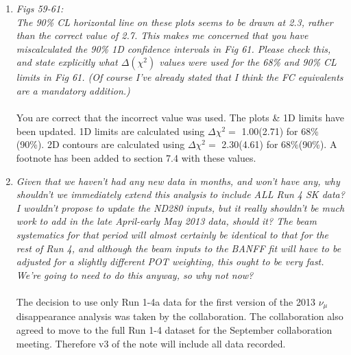 \begin{enumerate}
  
  \vspace{5 mm}
\item
  {\em
    Figs 59-61:\\
    The 90\% CL horizontal line on these plots seems to be drawn at 2.3, rather than the correct value of 2.7.
    This makes me concerned that you have miscalculated the 90\% 1D confidence intervals in Fig 61.
    Please check this, and state explicitly what $\Delta(\chi^2)$ values were used for the 68\% and 90\% CL limits in Fig 61.
    (Of course I've already stated that I think the FC equivalents are a mandatory addition.)
  }\\
  \\
  You are correct that the incorrect value was used. The plots \& 1D limits have been updated.
  1D limits are calculated using $\Delta \chi^2 =$ 1.00(2.71) for 68\%(90\%).
  2D contours are calculated using $\Delta \chi^2 =$ 2.30(4.61) for 68\%(90\%).
  A footnote has been added to section 7.4 with these values.

  \vspace{5 mm}
\item
  {\em
    Given that we haven't had any new data in months, and won't have any, why shouldn't we immediately extend
    this analysis to include ALL Run 4 SK data?  I wouldn't propose to update the ND280 inputs,
    but it really shouldn't be much work to add in the late April-early May 2013 data, should it?
    The beam systematics for that period will almost certainly be identical to that for the rest of Run 4,
    and although the beam inputs to the BANFF fit will have to be adjusted for a slightly different POT weighting,
    this ought to be very fast.  We're going to need to do this anyway, so why not now?
  }\\
  \\
  The decision to use only Run 1-4a data for the first version of
  the 2013 $\nu_\mu$ disappearance analysis was taken by the collaboration.
  The collaboration also agreed to move to the full Run 1-4 dataset for the
  September collaboration meeting.
  Therefore v3 of the note will include all data recorded.


\end{enumerate}
